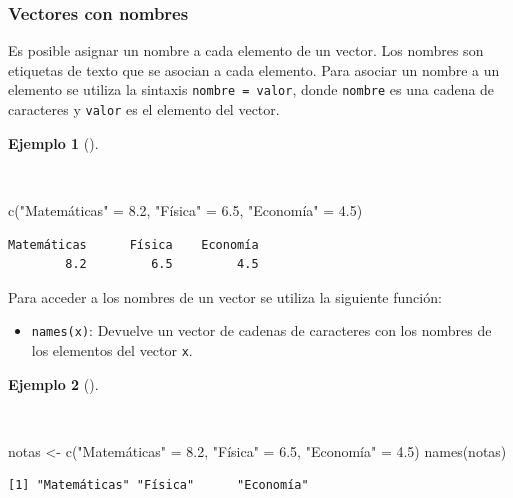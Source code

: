 \documentclass[
  spanish,
  a4paper,
]{scrreport}
\newenvironment{Shaded}{\begin{snugshade}}{\end{snugshade}}
\newcommand{\FloatTok}[1]{\textcolor[rgb]{0.68,0.00,0.00}{#1}}
\newcommand{\FunctionTok}[1]{\textcolor[rgb]{0.28,0.35,0.67}{#1}}
\newcommand{\NormalTok}[1]{\textcolor[rgb]{0.00,0.23,0.31}{#1}}
\newcommand{\OtherTok}[1]{\textcolor[rgb]{0.00,0.23,0.31}{#1}}
\newcommand{\StringTok}[1]{\textcolor[rgb]{0.13,0.47,0.30}{#1}}
\providecommand{\tightlist}{%
  \setlength{\itemsep}{0pt}\setlength{\parskip}{0pt}}
\theoremstyle{definition}
\theoremstyle{definition}
\newtheorem{example}{Ejemplo}[chapter]
\theoremstyle{remark}
\begin{document}
\subsubsection{Vectores con nombres}\label{vectores-con-nombres}

Es posible asignar un nombre a cada elemento de un vector. Los nombres
son etiquetas de texto que se asocian a cada elemento. Para asociar un
nombre a un elemento se utiliza la sintaxis \texttt{nombre\ =\ valor},
donde \texttt{nombre} es una cadena de caracteres y \texttt{valor} es el
elemento del vector.

\begin{example}[]\protect\hypertarget{exm-vectores-con-nombre}{}\label{exm-vectores-con-nombre}

~

\begin{Shaded}
\begin{Highlighting}[]
\FunctionTok{c}\NormalTok{(}\StringTok{"Matemáticas"} \OtherTok{=} \FloatTok{8.2}\NormalTok{, }\StringTok{"Física"} \OtherTok{=} \FloatTok{6.5}\NormalTok{, }\StringTok{"Economía"} \OtherTok{=} \FloatTok{4.5}\NormalTok{)}
\end{Highlighting}
\end{Shaded}

\begin{verbatim}
Matemáticas      Física    Economía 
        8.2         6.5         4.5 
\end{verbatim}

\end{example}

Para acceder a los nombres de un vector se utiliza la siguiente función:

\begin{itemize}
\tightlist
\item
  \texttt{names(x)}: Devuelve un vector de cadenas de caracteres con los
  nombres de los elementos del vector \texttt{x}.
\end{itemize}

\begin{example}[]\protect\hypertarget{exm-acceso-nombres-vector}{}\label{exm-acceso-nombres-vector}

~

\begin{Shaded}
\begin{Highlighting}[]
\NormalTok{notas }\OtherTok{\textless{}{-}} \FunctionTok{c}\NormalTok{(}\StringTok{"Matemáticas"} \OtherTok{=} \FloatTok{8.2}\NormalTok{, }\StringTok{"Física"} \OtherTok{=} \FloatTok{6.5}\NormalTok{, }\StringTok{"Economía"} \OtherTok{=} \FloatTok{4.5}\NormalTok{)}
\FunctionTok{names}\NormalTok{(notas)}
\end{Highlighting}
\end{Shaded}

\begin{verbatim}
[1] "Matemáticas" "Física"      "Economía"   
\end{verbatim}

\end{example}
\end{document}
